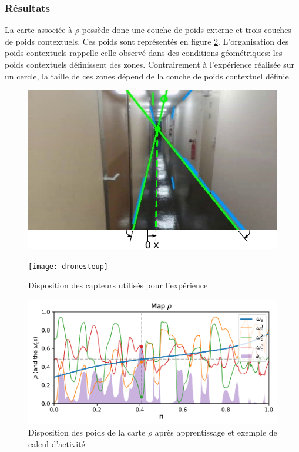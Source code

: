 \documentclass[../main]{subfiles}
\begin{document}

\subsubsection{Résultats}
La carte associée à $\rho$ possède donc une couche de poids externe et trois couches de poids contextuels. Ces poids sont représentés en figure \ref{fig:drone_w}. L'organisation des poids contextuels rappelle celle observé dans des conditions géométriques: les poids contextuels définissent des zones. Contrairement à l'expérience réalisée sur un cercle, la taille de ces zones dépend de la couche de poids contextuel définie. 

\begin{figure}
\begin{minipage}{0.5\textwidth}
\includegraphics[width=\textwidth]{visudrone}
\end{minipage}
\begin{minipage}{0.5\textwidth}
\texttt{[image: dronesteup]}
\end{minipage}
\caption{Disposition des capteurs utilisés pour l'expérience}
\label{fig:drone}
\end{figure}

\begin{figure}
\includegraphics[width=\textwidth]{dronemap}
\caption{Disposition des poids de la carte $\rho$ après apprentissage et exemple de calcul d'activité}
\label{fig:drone_w}
\end{figure}
\end{document}

